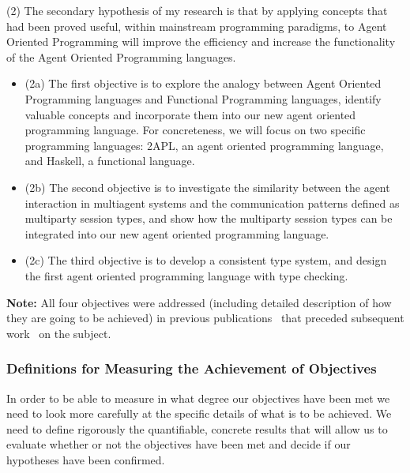 \documentclass[a4paper,12pt,oneside,fleqn]{book} %
\begin{document}
(2) The secondary hypothesis of my research is that by applying concepts
that had been proved useful, within mainstream programming paradigms, to
Agent Oriented Programming will improve the efficiency and increase
the functionality of the Agent Oriented Programming languages. 
\begin{itemize}

  \item (2a) The first objective is to explore the analogy between Agent
    Oriented Programming languages and Functional Programming languages,
    identify valuable concepts and incorporate them into our new agent
    oriented programming language. For concreteness, we will focus on two
    specific programming languages: 2APL, an agent oriented programming
    language, and Haskell, a functional language. 

  \item (2b) The second objective is to investigate the similarity between
    the agent interaction in multiagent systems and the communication
    patterns defined as multiparty session types, and show how the
    multiparty session types can be integrated into our new agent oriented
    programming language.

  \item (2c) The third objective is to develop a consistent type system,
    and design the first agent oriented programming language with
    type checking.

\end{itemize}

\textbf{Note:} All four objectives were addressed (including detailed
description of how they are going to be achieved) in previous
publications~\cite{DBLP:conf/oopsla/GrigoreC11, DBLP:conf/iat/GrigoreC11}
that preceded subsequent work~\cite{DBLP:conf/dalt/SolimandoT12, DBLP:conf/dalt/AnconaDM12, DBLP:conf/promas/RicciS12} on the subject. 

\subsubsection{Definitions for Measuring the Achievement of Objectives}%

In order to be able to measure in what degree our objectives have been met
we need to look more carefully at the specific details of what is to be
achieved. We need to define rigorously the quantifiable, concrete results
that will allow us to evaluate whether or not the objectives have been met
and decide if our hypotheses have been confirmed.
\end{document}
